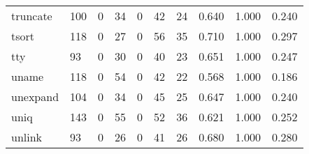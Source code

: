 \begin{longtable}{lp{2.0cm}p{2.0cm}p{2.0cm}p{2.0cm}p{2.0cm}p{2.0cm}p{2.0cm}p{2.0cm}p{2.0cm}}
truncate  &                    100 &                                  0 &                                34 &                                0 &                                42 &                              24 &                                0.640 &                                  1.000 &                                0.240 \\
tsort     &                    118 &                                  0 &                                27 &                                0 &                                56 &                              35 &                                0.710 &                                  1.000 &                                0.297 \\
tty       &                     93 &                                  0 &                                30 &                                0 &                                40 &                              23 &                                0.651 &                                  1.000 &                                0.247 \\
uname     &                    118 &                                  0 &                                54 &                                0 &                                42 &                              22 &                                0.568 &                                  1.000 &                                0.186 \\
unexpand  &                    104 &                                  0 &                                34 &                                0 &                                45 &                              25 &                                0.647 &                                  1.000 &                                0.240 \\
uniq      &                    143 &                                  0 &                                55 &                                0 &                                52 &                              36 &                                0.621 &                                  1.000 &                                0.252 \\
unlink    &                     93 &                                  0 &                                26 &                                0 &                                41 &                              26 &                                0.680 &                                  1.000 &                                0.280 \\

\end{longtable}
